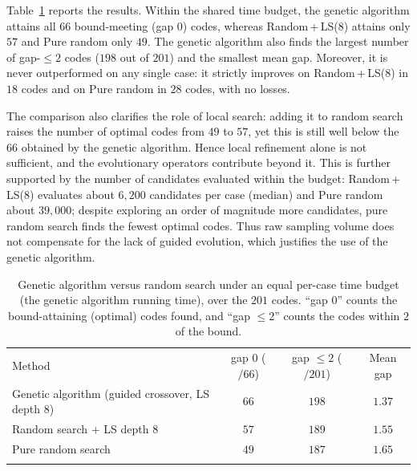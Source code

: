 \documentclass{article}
\begin{document}
Table~\ref{tab:ga_vs_random} reports the results. Within the shared time budget, the genetic algorithm attains all $66$ bound-meeting (gap $0$) codes, whereas Random\,+\,LS(8) attains only $57$ and Pure random only $49$. The genetic algorithm also finds the largest number of gap-$\leq 2$ codes ($198$ out of $201$) and the smallest mean gap. Moreover, it is never outperformed on any single case: it strictly improves on Random\,+\,LS(8) in $18$ codes and on Pure random in $28$ codes, with no losses.

The comparison also clarifies the role of local search: adding it to random search raises the number of optimal codes from $49$ to $57$, yet this is still well below the $66$ obtained by the genetic algorithm. Hence local refinement alone is not sufficient, and the evolutionary operators contribute beyond it. This is further supported by the number of candidates evaluated within the budget: Random\,+\,LS(8) evaluates about $6{,}200$ candidates per case (median) and Pure random about $39{,}000$; despite exploring an order of magnitude more candidates, pure random search finds the fewest optimal codes. Thus raw sampling volume does not compensate for the lack of guided evolution, which justifies the use of the genetic algorithm.


\begin{table}[htbp]
\centering
\caption{Genetic algorithm versus random search under an equal per-case time budget (the genetic algorithm running time), over the $201$ codes. ``gap $0$'' counts the bound-attaining (optimal) codes found, and ``gap $\leq 2$'' counts the codes within $2$ of the bound.}
\label{tab:ga_vs_random}
\small
\renewcommand{\arraystretch}{1.3}
\setlength{\tabcolsep}{6pt}
\begin{tabular}{l|c|c|c}
\Xhline{2\arrayrulewidth}
Method & gap $0$ ($/66$) & gap $\leq 2$ ($/201$) & Mean gap \\
\Xhline{2\arrayrulewidth}
Genetic algorithm (guided crossover, LS depth $8$) & $66$ & $198$ & $1.37$ \\
\hline
Random search $+$ LS depth $8$ & $57$ & $189$ & $1.55$ \\
\hline
Pure random search & $49$ & $187$ & $1.65$ \\
\Xhline{2\arrayrulewidth}
\end{tabular}
\end{table}
\FloatBarrier
\end{document}
